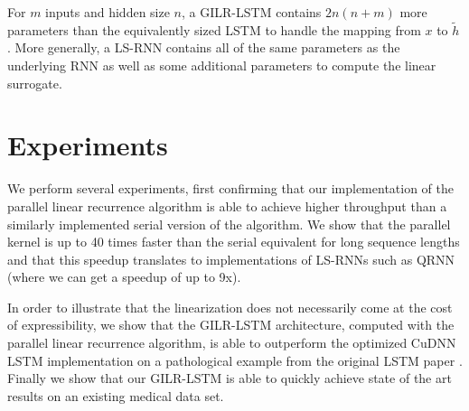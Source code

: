 \documentclass{article}
\begin{document}
For $m$ inputs and hidden size $n$, a GILR-LSTM contains $2n(n+m)$ more
parameters than the equivalently sized LSTM to handle the mapping from $x$ to
$\tilde{h}$. More generally, a LS-RNN contains all of the same parameters as the
underlying RNN as well as some additional parameters to compute the linear
surrogate.

\section{Experiments}
We perform several experiments, first confirming that our implementation of the
parallel linear recurrence algorithm is able to achieve higher throughput than a
similarly implemented serial version of the algorithm. We show that the parallel kernel
is up to 40 times faster than the serial equivalent for long sequence lengths and
that this speedup translates to implementations of LS-RNNs such as QRNN (where
we can get a speedup of up to 9x).

In order to illustrate that the linearization does not necessarily come at the
cost of expressibility, we show that the GILR-LSTM architecture, computed with
the parallel linear recurrence algorithm, is able to outperform the optimized CuDNN LSTM
implementation
on a pathological example from the original LSTM paper
\cite{hochreiter1997long}. Finally we show that our GILR-LSTM is able to
quickly achieve state of the art results on an existing medical data
set. 
\end{document}
